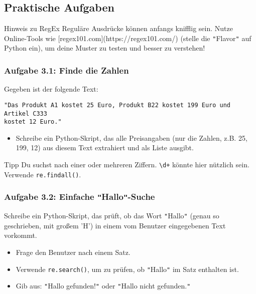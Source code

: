 \documentclass[11pt, a4paper]{article}
\begin{document}
\subsection*{Praktische Aufgaben \faLaptopCode}

\begin{alertbox}{Hinweis zu RegEx}
Reguläre Ausdrücke können anfangs knifflig sein. Nutze Online-Tools wie [regex101.com](https://regex101.com/) (stelle die \texttt{"}Flavor\texttt{"} auf Python ein), um deine Muster zu testen und besser zu verstehen!
\end{alertbox}

\subsubsection*{Aufgabe 3.1: Finde die Zahlen}
Gegeben ist der folgende Text:
\begin{verbatim}
"Das Produkt A1 kostet 25 Euro, Produkt B22 kostet 199 Euro und Artikel C333 
kostet 12 Euro."
\end{verbatim}
\begin{itemize}
    \item Schreibe ein Python-Skript, das alle Preisangaben (nur die Zahlen, z.B. 25, 199, 12) aus diesem Text extrahiert und als Liste ausgibt.
\end{itemize}
\begin{infoblock}{Tipp}
Du suchst nach einer oder mehreren Ziffern. \texttt{\textbackslash{}d+} könnte hier nützlich sein. Verwende \texttt{re.findall()}.
\end{infoblock}

\subsubsection*{Aufgabe 3.2: Einfache \texttt{"}Hallo\texttt{"}-Suche}
Schreibe ein Python-Skript, das prüft, ob das Wort \texttt{"}Hallo\texttt{"} (genau so geschrieben, mit großem 'H') in einem vom Benutzer eingegebenen Text vorkommt.

\begin{itemize}
    \item Frage den Benutzer nach einem Satz.
    \item Verwende \texttt{re.search()}, um zu prüfen, ob \texttt{"}Hallo\texttt{"} im Satz enthalten ist.
    \item Gib aus: \texttt{"}Hallo gefunden!\texttt{"} oder \texttt{"}Hallo nicht gefunden.\texttt{"}
\end{itemize}
\end{document}
